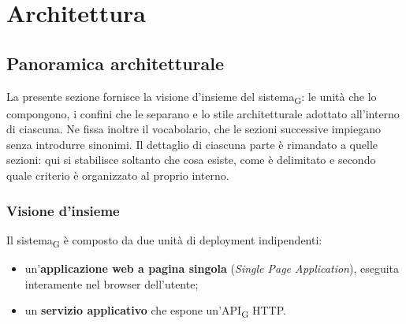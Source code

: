 \documentclass[a4paper, 10pt]{article}
\begin{document}
\newpage


%
%
\section{Architettura}
\label{sec:architettura}

\subsection{Panoramica architetturale}
\label{sec:architettura-panoramica}
La presente sezione fornisce la visione d'insieme del sistema\textsubscript{G}: le unità che lo compongono, i confini che le separano e lo stile architetturale adottato all'interno di ciascuna. Ne fissa inoltre il vocabolario, che le sezioni successive impiegano senza introdurre sinonimi. Il dettaglio di ciascuna parte è rimandato a quelle sezioni: qui si stabilisce soltanto che cosa esiste, come è delimitato e secondo quale criterio è organizzato al proprio interno.

\subsubsection{Visione d'insieme}
\label{sec:panoramica-visione}
Il sistema\textsubscript{G} è composto da due unità di deployment indipendenti:

\begin{itemize}
    \setlength{\itemsep}{0pt}
    \item un'\textbf{applicazione web a pagina singola} (\textit{Single Page Application}), eseguita interamente nel browser dell'utente;
    \item un \textbf{servizio applicativo} che espone un'API\textsubscript{G} HTTP.
\end{itemize}
\end{document}

